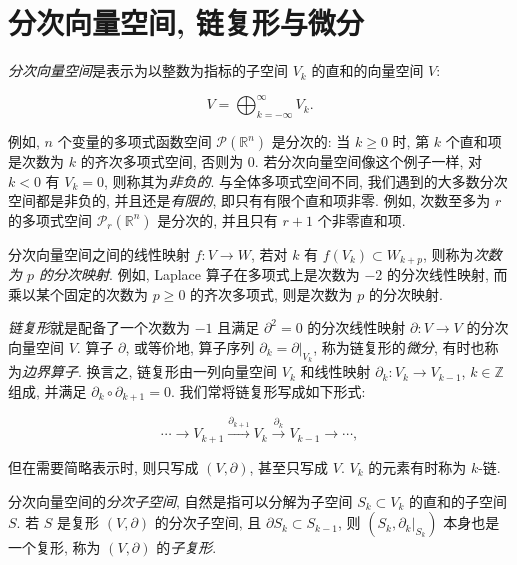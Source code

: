 \section{{分次向量空间, 链复形与微分}}\label{sec:graded-chain-complexes}

{\emph{分次向量空间}是表示为以整数为指标的子空间 $V_k$ 的直和的向量空间 $V$:}

\[
V=\bigoplus_{k=-\infty}^{\infty}V_k.
\]

{例如, $n$ 个变量的多项式函数空间 $\mathcal P(\mathbb R^n)$ 是分次的: 当 $k\geq0$ 时, 第 $k$ 个直和项是次数为 $k$ 的齐次多项式空间, 否则为 $0$. 若分次向量空间像这个例子一样, 对 $k<0$ 有 $V_k=0$, 则称其为\emph{非负的}. 与全体多项式空间不同, 我们遇到的大多数分次空间都是非负的, 并且还是\emph{有限的}, 即只有有限个直和项非零. 例如, 次数至多为 $r$ 的多项式空间 $\mathcal P_r(\mathbb R^n)$ 是分次的, 并且只有 $r+1$ 个非零直和项.}

{分次向量空间之间的线性映射 $f:V\to W$, 若对 $k$ 有 $f(V_k)\subset W_{k+p}$, 则称为\emph{次数为 $p$ 的分次映射}. 例如, Laplace 算子在多项式上是次数为 $-2$ 的分次线性映射, 而乘以某个固定的次数为 $p\geq0$ 的齐次多项式, 则是次数为 $p$ 的分次映射.}

{\emph{链复形}就是配备了一个次数为 $-1$ 且满足 $\partial^2=0$ 的分次线性映射 $\partial:V\to V$ 的分次向量空间 $V$. 算子 $\partial$, 或等价地, 算子序列 $\partial_k=\partial|_{V_k}$, 称为链复形的\emph{微分}, 有时也称为\emph{边界算子}. 换言之, 链复形由一列向量空间 $V_k$ 和线性映射 $\partial_k:V_k\to V_{k-1}$, $k\in\mathbb Z$ 组成, 并满足 $\partial_k\circ\partial_{k+1}=0$. 我们常将链复形写成如下形式:}

\[
\cdots\to V_{k+1}\xrightarrow{\partial_{k+1}}V_k\xrightarrow{\partial_k}V_{k-1}\to\cdots,
\]

{但在需要简略表示时, 则只写成 $(V,\partial)$, 甚至只写成 $V$. $V_k$ 的元素有时称为 $k$-链.}

{分次向量空间的\emph{分次子空间}, 自然是指可以分解为子空间 $S_k\subset V_k$ 的直和的子空间 $S$. 若 $S$ 是复形 $(V,\partial)$ 的分次子空间, 且 $\partial S_k\subset S_{k-1}$, 则 $(S_k,\partial_k|_{S_k})$ 本身也是一个复形, 称为 $(V,\partial)$ 的\emph{子复形}.}
